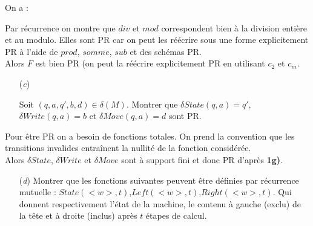 \documentclass[12pt,letterpaper,boxed]{hmcpset}
\newcommand*\widefbox[1]{\fbox{\hspace{2em}#1\hspace{2em}}}
\begin{document}
\begin{solution}[b)]

On a : 




Par récurrence on montre que $div$ et $mod$ correspondent bien à la division entière et au modulo. Elles sont PR car on peut les réécrire sous une forme explicitement PR à l'aide de $prod$, $somme$, $sub$ et des schémas PR. \\
Alors $F$ est bien PR (on peut la réécrire explicitement PR en utilisant $c_{2}$ et $c_{m}$.

\end{solution}

\newpage

\begin{problem}
\begin{itemize}
  \item[(\textit{c})] 
  
  Soit $(q,a,q',b,d) \in \delta(M)$. Montrer que $\delta State(q,a) = q'$,  $\delta Write(q,a) = b$ et $\delta Move(q,a) = d$ sont PR.
    
   \end{itemize}
\end{problem}

\begin{solution}[c)]

Pour être PR on a besoin de fonctions totales. On prend la convention que les transitions invalides entraînent la nullité de la fonction considérée.\\
Alors $\delta State$, $\delta Write$ et $\delta Move$ sont à support fini et donc PR d'après \textbf{1g)}.

\end{solution}

\begin{problem}
\begin{itemize}
  \item[(\textit{d})] 
  Montrer que les fonctions suivantes peuvent être définies par récurrence mutuelle :
  $State(<w>,t)$,$Left(<w>,t)$,$Right(<w>,t)$. Qui donnent respectivement l'état de la machine, le contenu à gauche (exclu) de la tête et à droite (inclus) après $t$ étapes de calcul.
   \end{itemize}
\end{problem}
\end{document}

